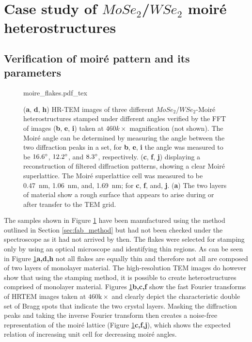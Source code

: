 \section{Case study of $MoSe_2$/$WSe_2$ moiré heterostructures}

\subsection{Verification of moiré pattern and its parameters}

\begin{figure}
    \centering
    \def\svgwidth{.9\linewidth}
    {moire_flakes.pdf_tex}
    \caption{(\textbf{a}, \textbf{d}, \textbf{h}) HR-TEM images of three different $MoSe_2$/$WSe_2$-Moiré heterostructures stamped under different angles verified by the FFT of images (\textbf{b}, \textbf{e}, \textbf{i}) taken at $460k\times$ magnification (not shown). The Moiré angle can be determined by measuring the angle between the two diffraction peaks in a set, for \textbf{b}, \textbf{e}, \textbf{i} the angle was measured to be $16.6\degree$, $12.2\degree$, and $8.3\degree$, respectively. (\textbf{c}, \textbf{f}, \textbf{j}) displaying a reconstruction of filtered diffraction patterns, showing a clear Moiré superlattice. The Moiré superlattice cell was measured to be \SI{0.47}{nm}, \SI{1.06}{nm}, and, \SI{1.69}{nm}; for \textbf{c}, \textbf{f}, and, \textbf{j}. (\textbf{a}) The two layers of material show a rough surface that appears to arise during or after transfer to the TEM grid.}
    \label{fig:moire_overview}
\end{figure}

The samples shown in Figure \ref{fig:moire_overview} have been manufactured using the method outlined in Section \ref{sec:fab_method} but had not been checked under the spectroscope as it had not arrived by then. The flakes were selected for stamping only by using an optical microscope and identifying thin regions. As can be seen in Figure \ref{fig:moire_overview}\textbf{a,d,h} not all flakes are equally thin and therefore not all are composed of two layers of monolayer material. The high-resolution TEM images do however show that using the stamping method, it is possible to create heterostructures comprised of monolayer material. Figures \ref{fig:moire_overview}\textbf{b,c,f} show the fast Fourier transforms of HRTEM images taken at $460\mathrm{k}\times$ and clearly depict the characteristic double set of Bragg spots that indicate the two crystal layers. Masking the diffraction peaks and taking the inverse Fourier transform then creates a noise-free representation of the moiré lattice (Figure \ref{fig:moire_overview}\textbf{c,f,j}), which shows the expected relation of increasing unit cell for decreasing moiré angles.


